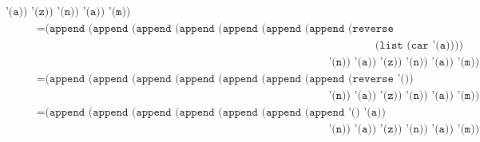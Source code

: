 \documentclass[letterpaper,11pt]{article}
\begin{document}
\begin{enumerate}
\begin{enumerate}
\begin{align*}
              \; \; \; \; \; \; \; \; \; \; \; \; \; \; \; \; \; \; \; \; \; \; \;
              \; \; \; \; \; \; \; \; \; \; \; \texttt{'(a)) '(z)) '(n)) '(a)) '(m))} \\
            &= \texttt{(append (append (append (append (append (append (append (reverse (cdr '(a)))} \\ 
            & \; \; \; \; \; \; \; \; \; \; \; \; \; \; \; \; \; \; \; \; \; \; \;
              \; \; \; \; \; \; \; \; \; \; \; \; \; \; \; \; \; \; \; \; \; \; \;
              \; \; \; \; \; \; \; \; \; \; \; \; \; \; \; \; \; \; \; \; \; \; \;
              \; \; \; \; \; \; \; \; \; \; \; \; \; \; \; \; \; \; \; \; \; \; \;
              \; \; \; \; \; \; \; \; \; \; \; \; \; \; \; \; \; 
                                                                               \texttt{(list (car '(a))))} \\ 
            & \; \; \; \; \; \; \; \; \; \; \; \; \; \; \; \; \; \; \; \; \; \; \;
              \; \; \; \; \; \; \; \; \; \; \; \; \; \; \; \; \; \; \; \; \; \; \;
              \; \; \; \; \; \; \; \; \; \; \; \; \; \; \; \; \; \; \; \; \; \; \;
              \; \; \; \; \; \; \; \; \; \; \; \; \; \; \; \; \; \; \; \; \; \; \;
              \; \; 
                                                                       \texttt{'(n)) '(a)) '(z)) '(n)) '(a)) '(m))} \\
            &= \texttt{(append (append (append (append (append (append (append (reverse '()) (list a))} \\
            & \; \; \; \; \; \; \; \; \; \; \; \; \; \; \; \; \; \; \; \; \; \; \;
              \; \; \; \; \; \; \; \; \; \; \; \; \; \; \; \; \; \; \; \; \; \; \;
              \; \; \; \; \; \; \; \; \; \; \; \; \; \; \; \; \; \; \; \; \; \; \;
              \; \; \; \; \; \; \; \; \; \; \; \; \; \; \; \; \; \; \; \; \; \; \;
              \; \; 
                                                                       \texttt{'(n)) '(a)) '(z)) '(n)) '(a)) '(m))} \\
            &= \texttt{(append (append (append (append (append (append (append '() '(a))} \\
            & \; \; \; \; \; \; \; \; \; \; \; \; \; \; \; \; \; \; \; \; \; \; \;
              \; \; \; \; \; \; \; \; \; \; \; \; \; \; \; \; \; \; \; \; \; \; \;
              \; \; \; \; \; \; \; \; \; \; \; \; \; \; \; \; \; \; \; \; \; \; \;
              \; \; \; \; \; \; \; \; \; \; \; \; \; \; \; \; \; \; \; \; \; \; \;
              \; \; 
                                                                       \texttt{'(n)) '(a)) '(z)) '(n)) '(a)) '(m))} \\

\end{align*}
\end{enumerate}
\end{enumerate}
\end{document}

